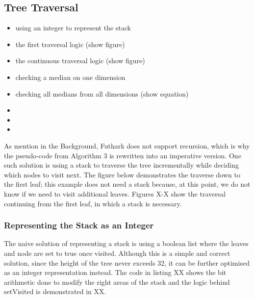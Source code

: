 \subsection{Tree Traversal}
\label{sec:traversal}


\begin{itemize}
	\item using an integer to represent the stack
	\item the first traversal logic (show figure)
	\item the continuous traversal logic (show figure)
	\item checking a median on one dimension
	\item checking all medians from all dimensions (show equation)
	\item 
	\item 
	\item 
\end{itemize}	


As mention in the Background, Futhark does not support recursion, which is why the pseudo-code from Algorithm 3 is rewritten into an imperative version. One such solution is using a stack to traverse the tree incrementally while deciding which nodes to visit next. The figure below demonstrates the traverse down to the first leaf; this example does not need a stack because, at this point, we do not know if we need to visit additional leaves. Figures X-X show the traversal continuing from the first leaf, in which a stack is necessary. 


\subsubsection{Representing the Stack as an Integer}

The naive solution of representing a stack is using a boolean list where the leaves and node are set to true once visited. Although this is a simple and correct solution, since the height of the tree never exceeds 32, it can be further optimised as an integer representation instead. The code in listing XX shows the bit arithmetic done to modify the right areas of the stack and the logic behind setVisited is demonstrated in XX. 

